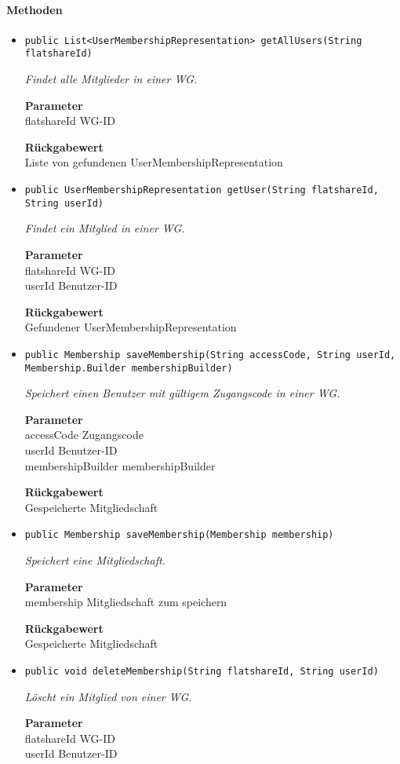      \paragraph*{Methoden}
     \begin{itemize}
     	\item{\texttt{public List<UserMembershipRepresentation> getAllUsers(String flatshareId)}}
     	
     	\textit{Findet alle Mitglieder in einer WG.}
     	
     	\textbf{Parameter} \\
     	flatshareId WG-ID
     	
     	\textbf{Rückgabewert} \\
     	Liste von gefundenen UserMembershipRepresentation        \item{\texttt{public UserMembershipRepresentation getUser(String flatshareId, String userId)}}
     	
     	\textit{Findet ein Mitglied in einer WG.}
     	
     	\textbf{Parameter} \\
     	flatshareId WG-ID\\
     	userId Benutzer-ID
     	
     	\textbf{Rückgabewert} \\
     	Gefundener UserMembershipRepresentation        \item{\texttt{public Membership saveMembership(String accessCode, String userId, Membership.Builder membershipBuilder)}}
     	
     	\textit{Speichert einen Benutzer mit gültigem Zugangscode in einer WG.}
     	
     	\textbf{Parameter} \\
     	accessCode Zugangscode\\
     	userId Benutzer-ID\\
     	membershipBuilder membershipBuilder
     	
     	\textbf{Rückgabewert} \\
     	Gespeicherte Mitgliedschaft        \item{\texttt{public Membership saveMembership(Membership membership)}}
     	
     	\textit{Speichert eine Mitgliedschaft.}
     	
     	\textbf{Parameter} \\
     	membership Mitgliedschaft zum speichern
     	
     	\textbf{Rückgabewert} \\
     	Gespeicherte Mitgliedschaft        \item{\texttt{public void deleteMembership(String flatshareId, String userId)}}
     	
     	\textit{Löscht ein Mitglied von einer WG.}
     	
     	\textbf{Parameter} \\
     	flatshareId WG-ID\\
     	userId Benutzer-ID
     	
     	
     \end{itemize}
